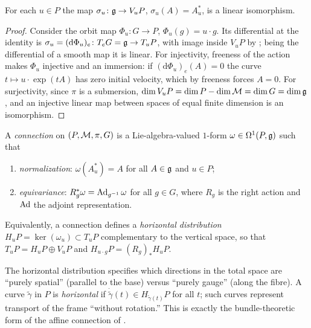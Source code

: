 \begin{proposition}
\label{prop:gauge:vertical-iso}
For each $u \in P$ the map $\sigma_u\colon \mathfrak{g} \to V_u P$, $\sigma_u(A) =
A^*_u$, is a linear isomorphism.
\end{proposition}

\begin{proof}
Consider the orbit map $\Phi_u\colon G \to P$, $\Phi_u(g) = u \cdot g$. Its
differential at the identity is $\sigma_u = (\mathrm{d}\Phi_u)_e\colon T_e G =
\mathfrak{g} \to T_u P$, with image inside $V_u P$ by
; being the differential of a smooth map it is linear.
For injectivity, freeness of the action makes $\Phi_u$ injective and an
immersion: if $(\mathrm{d}\Phi_u)_e(A) = 0$ the curve $t \mapsto u \cdot \exp(tA)$
has zero initial velocity, which by freeness forces $A = 0$. For surjectivity,
since $\pi$ is a submersion, $\dim V_u P = \dim P - \dim \mathcal{M} = \dim G = \dim
\mathfrak{g}$, and an injective linear map between spaces of equal finite dimension is
an isomorphism.
\end{proof}

\begin{definition}[Connection]
\label{def:gauge:connection}
A \emph{connection} on $(P, \mathcal{M}, \pi, G)$ is a Lie-algebra-valued $1$-form
$\omega \in \Omega^1(P, \mathfrak{g})$ such that
\begin{enumerate}
  \item \emph{normalization}: $\omega(A^*_u) = A$ for all $A \in \mathfrak{g}$ and
    $u \in P$;
  \item \emph{equivariance}: $R_g^* \omega = \operatorname{Ad}_{g^{-1}} \omega$ for all
    $g \in G$, where $R_g$ is the right action and $\operatorname{Ad}$ the adjoint
    representation.
\end{enumerate}
Equivalently, a connection defines a \emph{horizontal distribution}
$H_u P = \ker(\omega_u) \subset T_u P$ complementary to the vertical space, so
that $T_u P = H_u P \oplus V_u P$ and $H_{u \cdot g} P = (R_g)_* H_u P$.
\end{definition}

The horizontal distribution specifies which directions in the total space are
``purely spatial'' (parallel to the base) versus ``purely gauge'' (along the
fibre). A curve $\tilde\gamma$ in $P$ is \emph{horizontal} if
$\dot{\tilde\gamma}(t) \in H_{\tilde\gamma(t)} P$ for all $t$; such curves
represent transport of the frame ``without rotation.'' This is exactly the
bundle-theoretic form of the affine connection of .

